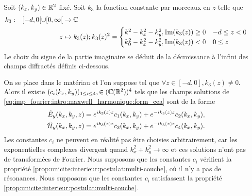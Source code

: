     \begin{defn}
        Soit \((k_x,k_y) \in \mathbb R^2\) fixé.
        Soit \(k_3\) la fonction constante par morceaux en \(z\) telle que
        \begin{equation*}
          \begin{aligned} &k_3: & [-d,0[\cup[0,\infty[ &\rightarrow \mathbb C \\ & & z & \mapsto 
            k_3(z); k_3(z)^2 =
            \begin{cases}
            k^2 - k_x^2 - k_y^2, \operatorname{Im}(k_3(z)) \ge 0 & -d \le z < 0
            \\
            k_0^2 - k_x^2 - k_y^2, \operatorname{Im}(k_3(z)) < 0 & 0 \le z
            \end{cases}
           \end{aligned}
        \end{equation*}
        Le choix du signe de la partie imaginaire se déduit de la décroissance à l'infini des champs diffractés définis ci-dessous.
    \end{defn}

    \begin{prop}
      On se place dans le matériau et l’on suppose tel que \(\forall z \in [-d,0], k_3(z) \not = 0\).
      Alors il existe \((c_i(k_x,k_y))_{1\le i \le4}, \in (\mathbb C(\mathbb R^2))^4\) tels que les champs solutions de \ref{eq:imp_fourier:intro:maxwell_harmonique:form_cea} sont de la forme
      \begin{align*}
        \hat{E}_y(k_x,k_y,z) & = e^{ik_3(z)z}c_1(k_x,k_y) + e^{-ik_3(z)z}c_2(k_x,k_y),
        \\
        \hat{\mathcal{H}}_y(k_x,k_y,z) & = e^{ik_3(z)z}c_3(k_x,k_y) + e^{-ik_3(z)z}c_4(k_x,k_y).
      \end{align*}
      Les constantes \(c_i\) ne peuvent en réalité pas être choisies arbitrairement, car les exponentielles complexes divergent quand \(k_x^2 + k_y^2 \rightarrow \infty\) et ces solutions n'ont pas de transformées de Fourier. Nous supposons que les constantes \(c_i\) vérifient la propriété \eqref{prop:unicite:interieur:postulat:multi-couche}, où il n'y a pas de résonances.
      Nous supposons que les constantes \(c_i\) satisfassent la propriété \eqref{prop:unicite:interieur:postulat:multi-couche}.
    \end{prop}

